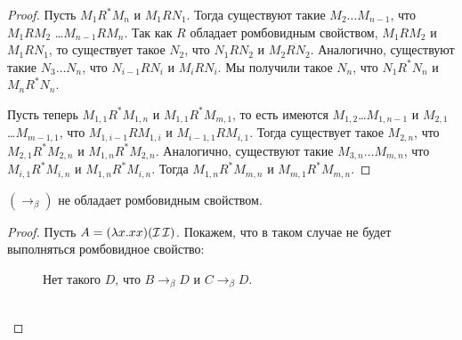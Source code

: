 \begin{proof}
    Пусть $M_1 R^{*} M_n$ и $M_1 R N_1$. Тогда существуют такие $M_2 \ldots M_{n-1}$, что $M_1 R M_2$ \ldots $M_{n-1} R M_n$.
	Так как $R$ обладает ромбовидным свойством, $M_1 R M_2$ и $M_1 R N_1$, то существует такое $N_2$,
	что $N_1 R N_2$ и $M_2 R N_2$. Аналогично, существуют такие $N_3 \ldots N_n$, что $N_{i-1} R N_{i}$ и $M_i R N_i$.
	Мы получили такое $N_n$, что $N_1 R^{*} N_n$ и $M_n R^{*} N_n$.
	
	Пусть теперь $M_{1,1}R^{*}M_{1,n}$ и $M_{1,1}R^{*}M_{m,1}$, то есть имеются $M_{1,2}$\ldots$M_{1,n-1}$ и $M_{2,1}$\ldots$M_{m-1,1}$,
	что $M_{1,i-1} R M_{1,i}$ и $M_{i-1, 1} R M_{i, 1}$.
	Тогда существует такое $M_{2,n}$, что $M_{2,1} R^{*} M_{2,n}$ и $M_{1,n} R^{*} M_{2,n}$.
	Аналогично, существуют такие $M_{3,n}\ldots M_{m,n}$, что $M_{i,1} R^{*} M_{i,n}$ и $M_{1,n} R^{*} M_{i,n}$.
	Тогда $M_{1,n} R^{*} M_{m,n}$ и $M_{m,1} R^{*} M_{m,n}$.
\end{proof}

\begin{lemma}
	$(\to_{\beta})$ не обладает ромбовидным свойством.
\end{lemma}

\begin{proof}
	Пусть $A=(\lambda{}x.x x)(\operatorname{\mathcal{I}} \operatorname{\mathcal{I}})$. Покажем, что в таком случае не будет выполняться ромбовидное свойство:
	\
	\begin{figure}[ht]
		\centering
		\caption{Нет такого $D$, что $B \to_{\beta} D$ и $C \to_{\beta} D$.}
	\end{figure}	
	\\
\end{proof}


